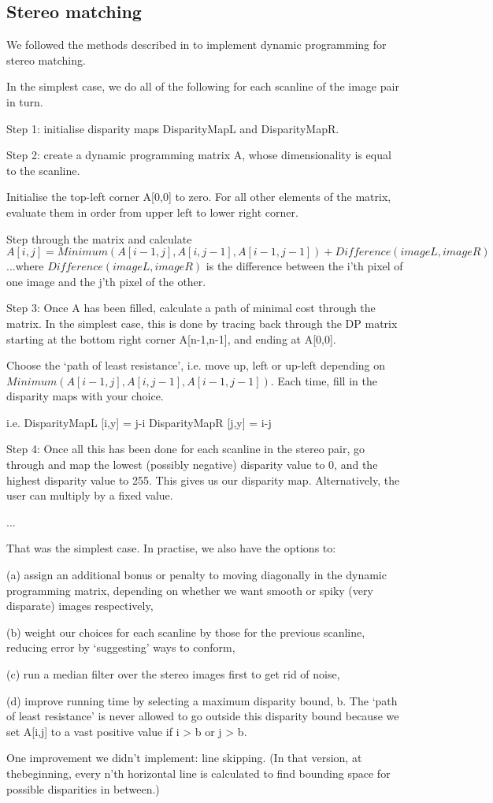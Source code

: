
\subsection{Stereo matching}
\label{sec:stereo}

We followed the methods described in \cite{realtimestereo} to implement dynamic programming for stereo matching.

In the simplest case, we do all of the following for each scanline of the image pair in turn.

Step 1: initialise disparity maps DisparityMapL and DisparityMapR.

Step 2: create a dynamic programming matrix A, whose dimensionality is equal to the scanline.

Initialise the top-left corner A[0,0] to zero. For all other elements of the matrix, evaluate them in order from upper left to lower right corner.

Step through the matrix and calculate
\[
A[i,j] = Minimum(A[i-1,j], A[i,j-1], A[i-1,j-1])  +  Difference(imageL, imageR)
\]
...where $Difference(imageL, imageR)$ is the difference between the i'th pixel of one image and the j'th pixel of the other.

Step 3: Once A has been filled, calculate a path of minimal cost through the matrix. In the simplest case, this is done by tracing back through the DP matrix starting at the bottom right corner A[n-1,n-1], and ending at A[0,0].

Choose the `path of least resistance', i.e. move up, left or up-left depending on $Minimum(A[i-1,j], A[i,j-1], A[i-1,j-1])$. Each time, fill in the disparity maps with your choice.

i.e.
DisparityMapL [i,y] = j-i
DisparityMapR [j,y] = i-j

Step 4: Once all this has been done for each scanline in the stereo pair, go through and map the lowest (possibly negative) disparity value to 0, and the highest disparity value to 255. This gives us our disparity map. Alternatively, the user can multiply by a fixed value.

...

That was the simplest case. In practise, we also have the options to:

(a) assign an additional bonus or penalty to moving diagonally in the dynamic programming matrix, depending on whether we want smooth or spiky (very disparate) images respectively,

(b) weight our choices for each scanline by those for the previous scanline, reducing error by `suggesting' ways to conform,

(c) run a median filter over the stereo images first to get rid of noise,

(d) improve running time by selecting a maximum disparity bound, b. The `path of least resistance' is never allowed to go outside this disparity bound because we set A[i,j] to a vast positive value if i > b or j > b.

%

One improvement we didn't implement: line skipping. (In that version, at thebeginning, every n’th horizontal line is calculated to find bounding space for possible disparities in between.)
